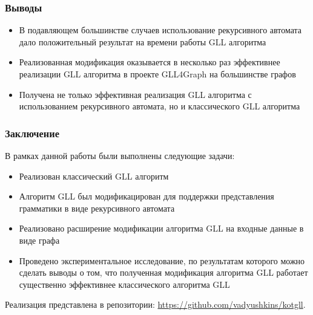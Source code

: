 \documentclass[aspectratio=169]{beamer}
\begin{document}
\begin{frame}
\transwipe[direction=90]
 \frametitle{Выводы}
\begin{itemize}
    \item В подавляющем большинстве случаев использование рекурсивного автомата дало положительный результат на времени работы GLL алгоритма
    \item Реализованная модификация оказывается в несколько раз эффективнее реализации GLL алгоритма в проекте GLL4Graph на большинстве графов
    \item Получена не только эффективная реализация GLL алгоритма с использованием рекурсивного автомата, но и классического GLL алгоритма
\end{itemize}
\end{frame}

\begin{frame}
\transwipe[direction=90]
 \frametitle{Заключение}
В рамках данной работы были выполнены следующие задачи:
\begin{itemize}
    \item Реализован классический GLL алгоритм
    \item Алгоритм GLL был модификацирован для поддержки представления грамматики в виде рекурсивного автомата
    \item Реализовано расширение модификации алгоритма GLL на входные данные в виде графа
    \item Проведено экспериментальное исследование, по результатам которого можно сделать выводы о том, что полученная модификация алгоритма GLL работает существенно эффективнее классического алгоритма GLL
\end{itemize}

Реализация представлена в репозитории: \url{https://github.com/vadyushkins/kotgll}.

\end{frame}
\end{document}
